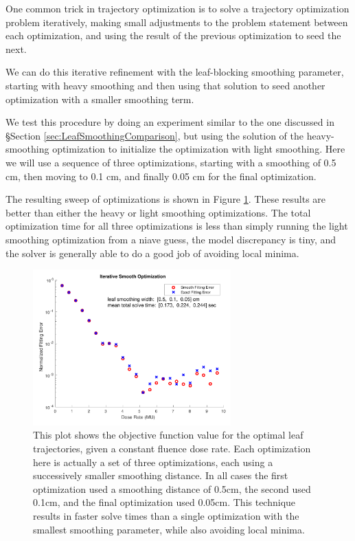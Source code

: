 One common trick in trajectory optimization is to solve a trajectory optimization problem
iteratively, making small adjustments to the problem statement between each optimization,
and using the result of the previous optimization to seed the next.

We can do this iterative refinement with the leaf-blocking smoothing parameter,
starting with heavy smoothing and then using that solution to seed another optimization
with a smaller smoothing term.

We test this procedure by doing an experiment similar to the one discussed in
\S Section \ref{sec:LeafSmoothingComparison}, but using the solution of the heavy-smoothing
optimization to initialize the optimization with light smoothing.
Here we will use a sequence of three optimizations, starting with a smoothing of
0.5 cm, then moving to 0.1 cm, and finally 0.05 cm for the final optimization.

The resulting sweep of optimizations is shown in Figure \ref{fig:iterSmoothSweep}.
These results are better than either the heavy or light smoothing optimizations.
The total optimization time for all three optimizations is less than simply running the
light smoothing optimization from a niave guess, the model discrepancy is tiny, and the
solver is generally able to do a good job of avoiding local minima.

\begin{figure}
  \centering
  \includegraphics[width=3in]{fig/iterSmoothSweep.pdf}
  \caption{This plot shows the objective function value for the optimal leaf trajectories,
           given a constant fluence dose rate. Each optimization here is actually a set of three
           optimizations, each using a successively smaller smoothing distance. In all cases
           the first optimization used a smoothing distance of 0.5cm, the second used 0.1cm,
           and the final optimization used 0.05cm. This technique results in faster solve times
           than a single optimization with the smallest smoothing parameter, while also avoiding
           local minima.}
  \label{fig:iterSmoothSweep}
\end{figure}

